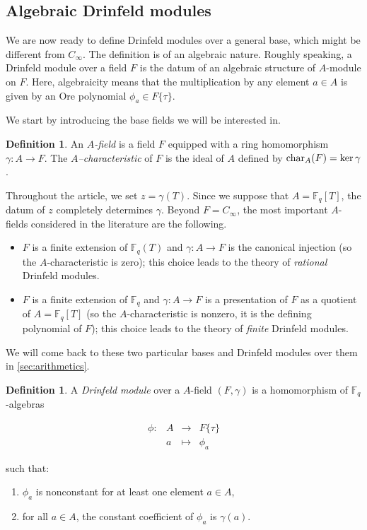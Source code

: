 \documentclass[11pt]{article}
\theoremstyle{definition}
\newtheorem{definition}[theorem]{Definition}
\newcommand{\Function}[5]{
  \[
    \begin{array}{rrcl}
    #1: & #2 & \to     & #3 \\
        & #4 & \mapsto & #5
    \end{array}
  \]
}
\newcommand\Fq{\mathbb{F}_q}
\newcommand\Acar{\text{\rm char}_A}
\newcommand{\Cinf}{C_{\infty}}
\newcommand{\Ftau}{F\{\tau\}}
\begin{document}
\subsection{Algebraic Drinfeld modules}
\label{ssec:drinfeld:def}
We are now ready to define Drinfeld modules over a general base, 
which might be different from $C_\infty$. The definition is of an algebraic nature. 
Roughly speaking, a Drinfeld module over a field $F$ is the datum of
an algebraic structure of $A$-module on $F$. Here, algebraicity means
that the multiplication by any element $a \in A$ is given by an Ore
polynomial $\phi_a \in F\{\tau\}$.

We start by introducing the base fields we will be interested in.

\begin{definition}
\label{def:Afield}
An \emph{$A$-field} is a field $F$ equipped with a ring homomorphism 
$\gamma : A \to F$.
The \emph{$A$--characteristic} of $F$ is the ideal of $A$ defined by
$\Acar(F)= \ker \gamma$. 
\end{definition}

Throughout the article, we set $z=\gamma(T)$. Since we suppose that $A=\Fq[T]$, the datum of $z$ completely determines $\gamma$. Beyond $F = \Cinf$, the most important $A$-fields considered in the literature are the following.
\begin{itemize}
\item 
$F$ is a finite extension of $\Fq(T)$ and $\gamma : A \to F$ is the canonical injection (so the $A$-characteristic is zero); this choice leads to the theory of \emph{rational} Drinfeld modules.
\item 
$F$ is a finite extension of $\Fq$ and $\gamma : A \to F$ is a presentation of $F$ as a quotient of $A = \Fq[T]$ (so the $A$-characteristic is nonzero, it is the defining polynomial of $F$); this choice leads to the theory of \emph{finite} Drinfeld modules. 
\end{itemize}

We will come back to these two particular bases and Drinfeld
modules over them in \cref{sec:arithmetics}.

\begin{definition}
\label{def:drinfeldmodule}
A \emph{Drinfeld module} over a $A$-field $(F, \gamma)$ is a homomorphism of $\Fq$-algebras
\Function
  {\phi}
  {A}
  {\Ftau}
  {a}
  {\phi_a}
such that:
\begin{enumerate}[label=(\roman{enumi})]
\item \label{cond:nontrivial}
$\phi_a$ is nonconstant for at least one element $a \in A$,
\item \label{cond:tangent}
for all $a \in A$, the constant coefficient of $\phi_a$ is $\gamma(a)$.
\end{enumerate}
\end{definition}
\end{document}
